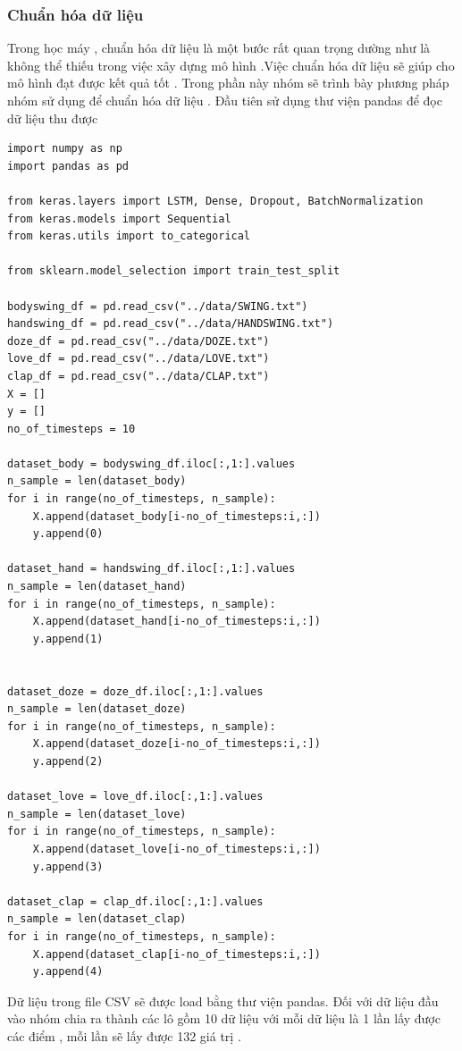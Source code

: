 \subsubsection{Chuẩn hóa dữ liệu}
Trong học máy , chuẩn hóa dữ liệu là một bước rất quan trọng dường như là không thể thiếu trong việc xây dựng mô hình .Việc chuẩn hóa dữ liệu sẽ giúp cho mô hình đạt được kết quả tốt . Trong phần này nhóm sẽ trình bày phương pháp nhóm sử dụng để chuẩn hóa dữ liệu . Đầu tiên sử dụng thư viện pandas để đọc dữ liệu thu được 
\begin{lstlisting}[style=codePython]
import numpy as np
import pandas as pd

from keras.layers import LSTM, Dense, Dropout, BatchNormalization
from keras.models import Sequential
from keras.utils import to_categorical

from sklearn.model_selection import train_test_split

bodyswing_df = pd.read_csv("../data/SWING.txt")
handswing_df = pd.read_csv("../data/HANDSWING.txt")
doze_df = pd.read_csv("../data/DOZE.txt")
love_df = pd.read_csv("../data/LOVE.txt")
clap_df = pd.read_csv("../data/CLAP.txt")
X = []
y = []
no_of_timesteps = 10

dataset_body = bodyswing_df.iloc[:,1:].values
n_sample = len(dataset_body)
for i in range(no_of_timesteps, n_sample):
    X.append(dataset_body[i-no_of_timesteps:i,:])
    y.append(0)

dataset_hand = handswing_df.iloc[:,1:].values
n_sample = len(dataset_hand)
for i in range(no_of_timesteps, n_sample):
    X.append(dataset_hand[i-no_of_timesteps:i,:])
    y.append(1)


dataset_doze = doze_df.iloc[:,1:].values
n_sample = len(dataset_doze)
for i in range(no_of_timesteps, n_sample):
    X.append(dataset_doze[i-no_of_timesteps:i,:])
    y.append(2)

dataset_love = love_df.iloc[:,1:].values
n_sample = len(dataset_love)
for i in range(no_of_timesteps, n_sample):
    X.append(dataset_love[i-no_of_timesteps:i,:])
    y.append(3)

dataset_clap = clap_df.iloc[:,1:].values
n_sample = len(dataset_clap)
for i in range(no_of_timesteps, n_sample):
    X.append(dataset_clap[i-no_of_timesteps:i,:])
    y.append(4)
\end{lstlisting}

Dữ liệu trong file CSV sẽ được load bằng thư viện pandas. Đối với dữ liệu đầu vào nhóm chia ra thành các lô gồm 10 dữ liệu với mỗi dữ liệu là 1 lần lấy được các điểm , mỗi lần sẽ lấy được 132 giá trị  . 

